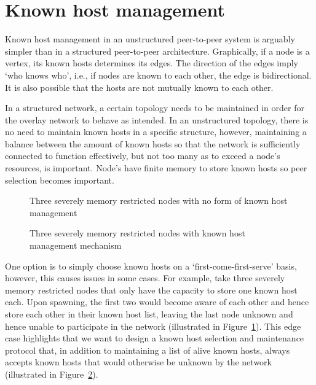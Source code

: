 \newpage


\section{Known host management}
\label{sec:knownHostManagement}

Known host management in an unstructured peer-to-peer system is arguably simpler than in a structured peer-to-peer architecture. Graphically, if a node is a vertex, its known hosts determines its edges. The direction of the edges imply `who knows who', i.e., if nodes are known to each other, the edge is bidirectional. It is also possible that the hosts are not mutually known to each other.

In a structured network, a certain topology needs to be maintained in order for the overlay network to behave as intended\cite{stoica2003chord}. In an unstructured topology, there is no need to maintain known hosts in a specific structure, however, maintaining a balance between the amount of known hosts so that the network is sufficiently connected to function effectively, but not too many as to exceed a node's resources, is important\cite{lua2005survey}. Node's have finite memory to store known hosts so peer selection becomes important.

\begin{figure}[ht]
    \centering
    
    \caption{Three severely memory restricted nodes with no form of known host management}
    \label{fig:memoryRestrictedUnmanaged}
\end{figure}

\begin{figure}[ht]
    \centering
    
    \caption{Three severely memory restricted nodes with known host management mechanism}
    \label{fig:memoryRestrictedManaged}
\end{figure}

One option is to simply choose known hosts on a `first-come-first-serve' basis, however, this causes issues in some cases. For example, take three severely memory restricted nodes that only have the capacity to store one known host each. Upon spawning, the first two would become aware of each other and hence store each other in their known host list, leaving the last node unknown and hence unable to participate in the network (illustrated in Figure~\ref{fig:memoryRestrictedUnmanaged}). This edge case highlights that we want to design a known host selection and maintenance protocol that, in addition to maintaining a list of alive known hosts, always accepts known hosts that would otherwise be unknown by the network (illustrated in Figure~\ref{fig:memoryRestrictedManaged}).

